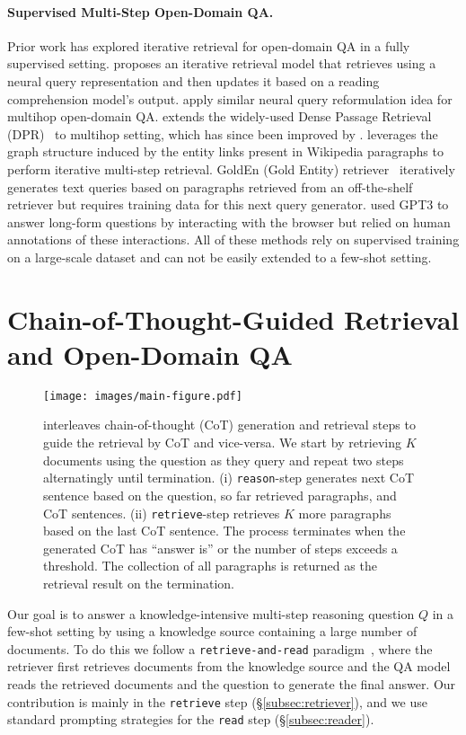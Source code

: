 \paragraph{Supervised Multi-Step Open-Domain QA.}
Prior work has explored iterative retrieval for open-domain QA in a fully supervised setting. \citet{multi-step-retriever-reader} proposes an iterative retrieval model that retrieves using a neural query representation and then updates it based on a reading comprehension model's output. \citet{multihop-retriever-odqa} apply similar neural query reformulation idea for multihop open-domain QA. \citet{mpr} extends the widely-used Dense Passage Retrieval (DPR)~\cite{dpr} to multihop setting, which has since been improved by \citet{baleen}. \citet{wikipatretriever} leverages the graph structure induced by the entity links present in Wikipedia paragraphs to perform iterative multi-step retrieval. GoldEn (Gold Entity) retriever~\cite{golden} iteratively generates text queries based on paragraphs retrieved from an off-the-shelf retriever but requires training data for this next query generator. \citet{webgpt} used GPT3 to answer long-form questions by interacting with the browser but relied on human annotations of these interactions. All of these methods rely on supervised training on a large-scale dataset and can not be easily extended to a few-shot setting.
\section{Chain-of-Thought-Guided Retrieval and Open-Domain QA}
\label{sec:method}

\begin{figure*}[!ht]
\centering
\texttt{[image: images/main-figure.pdf]}
\caption{\iconsys interleaves chain-of-thought (CoT) generation and retrieval steps to guide the retrieval by CoT and vice-versa. We start by retrieving $K$ documents using the question as they query and repeat two steps alternatingly until termination. (i) \texttt{reason}-step generates next CoT sentence based on the question, so far retrieved paragraphs, and CoT sentences. (ii) \texttt{retrieve}-step retrieves $K$ more paragraphs based on the last CoT sentence. The process terminates when the generated CoT has ``answer is'' or the number of steps exceeds a threshold. The collection of all paragraphs is returned as the retrieval result on the termination.}
\label{fig:main-figure}
\end{figure*}

Our goal is to answer a knowledge-intensive multi-step reasoning question $Q$ in a few-shot setting by using a knowledge source containing a large number of documents. To do this we follow a \texttt{retrieve-and-read} paradigm~\cite{retrieve-and-read}, where the retriever first retrieves documents from the knowledge source and the QA model reads the retrieved documents and the question to generate the final answer. Our contribution is mainly in the \texttt{retrieve} step (\S\ref{subsec:retriever}), and we use standard prompting strategies for the \texttt{read} step (\S\ref{subsec:reader}).

